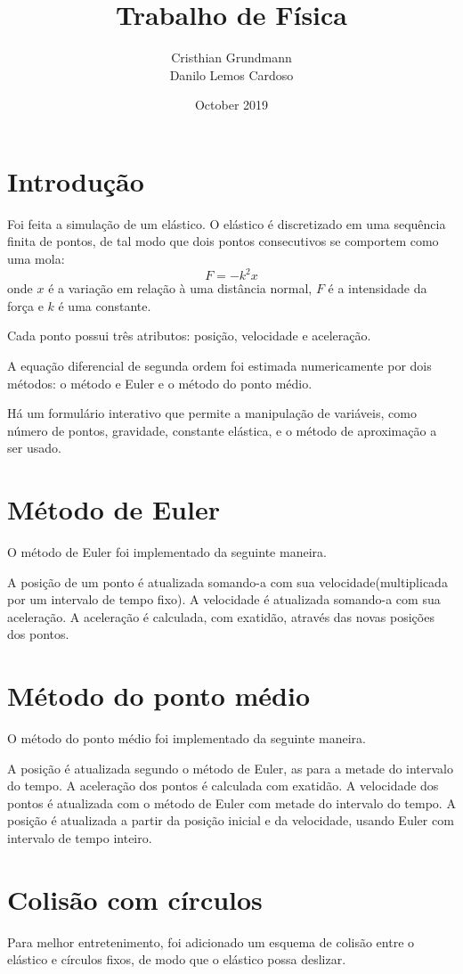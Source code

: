 \documentclass{article}
\title{Trabalho de Física}
\author{Cristhian Grundmann\\Danilo Lemos Cardoso}
\date{October 2019}
\begin{document}
\maketitle

\section*{Introdução}

Foi feita a simulação de um elástico. O elástico é discretizado em uma sequência finita de pontos, de tal modo que dois pontos consecutivos se comportem como uma mola:
$$ F = -k^2x $$
onde $x$ é a variação em relação à uma distância normal,
$F$ é a intensidade da força e
$k$ é uma constante.

Cada ponto possui três atributos: posição, velocidade e aceleração.

A equação diferencial de segunda ordem foi estimada numericamente por dois métodos: o método e Euler e o método do ponto médio.

Há um formulário interativo que permite a manipulação de variáveis, como número de pontos, gravidade, constante elástica, e o método de aproximação a ser usado.

\section*{Método de Euler}
O método de Euler foi implementado da seguinte maneira.

A posição de um ponto é atualizada somando-a com sua velocidade(multiplicada por um intervalo de tempo fixo). A velocidade é atualizada somando-a com sua aceleração. A aceleração é calculada, com exatidão, através das novas posições dos pontos.

\section*{Método do ponto médio}
O método do ponto médio foi implementado da seguinte maneira.

A posição é atualizada segundo o método de Euler, as para a metade do intervalo do tempo. A aceleração dos pontos é calculada com exatidão. A velocidade dos pontos é atualizada com o método de Euler com metade do intervalo do tempo. A posição é atualizada a partir da posição inicial e da velocidade, usando Euler com intervalo de tempo inteiro.

\section*{Colisão com círculos}
Para melhor entretenimento, foi adicionado um esquema de colisão entre o elástico e círculos fixos, de modo que o elástico possa deslizar.
\end{document}
